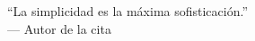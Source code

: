 \begin{paginaderecha}
\enquote{La simplicidad es la máxima sofisticación.}\\[6pt]
\upshape--- Autor de la cita
\end{paginaderecha}
